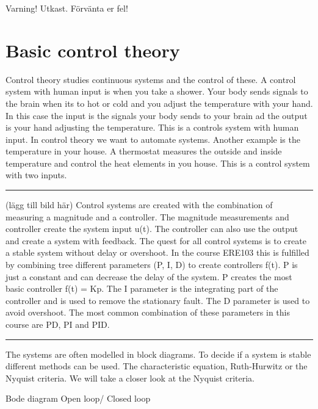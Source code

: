 Varning! Utkast. Förvänta er fel!

\section{Basic control theory}
Control theory studies continuous systems and the control of these. A control system with human input is when you take a shower. Your body sends signals to the brain when its to hot or cold and you adjust the temperature with your hand. In this case the input is the signals your body sends to your brain ad the output is your hand adjusting the temperature. This is a controls system with human input. In control theory we want to automate systems. Another example is the temperature in your house. A thermostat measures the outside and inside temperature and control the heat elements in you house. This is a control system with two inputs.
\hrule (lägg till bild här)
Control systems are created with the combination of measuring a magnitude and a controller. The magnitude measurements and controller create the system input u(t). The controller can also use the output and create a system with feedback. The quest for all control systems is to create a stable system without delay or overshoot. In the course ERE103 this is fulfilled by combining tree different parameters (P, I, D) to create controllers f(t).  P is just a constant and can decrease the delay of the system. P creates the most basic controller f(t) = Kp. The I parameter is the integrating part of the controller and is used to remove the stationary fault. The D parameter is used to avoid overshoot. The most common combination of these parameters in this course are PD, PI and PID.
\hrule
The systems are often modelled in block diagrams.
To decide if a system is stable different methods can be used. The characteristic equation, Ruth-Hurwitz or the Nyquist criteria. We will take a closer look at the Nyquist criteria. 

Bode diagram
Open loop/ Closed loop





